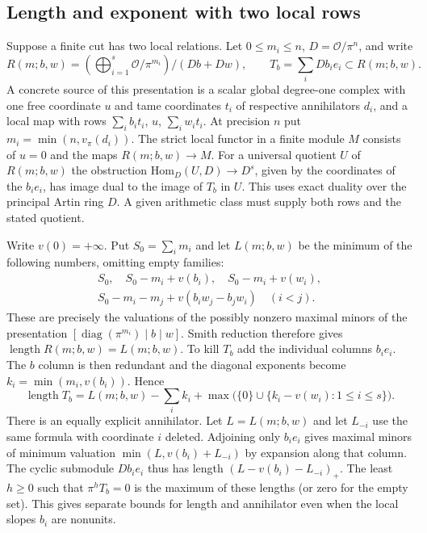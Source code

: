 \documentclass[11pt]{article}
\newcommand{\len}{\operatorname{length}}
\newcommand{\OO}{\mathcal O}
\begin{document}
\subsection{Length and exponent with two local rows}
Suppose a finite cut has two local relations. Let
$0\le m_i\le n$, $D=\OO/\pi^n$, and write
\[
 R(m;b,w)=\left(\bigoplus_{i=1}^s\OO/\pi^{m_i}\right)/(D b+D w),
 \qquad T_b=\sum_i D b_i e_i \subset R(m;b,w).
\]
A concrete source of this presentation is a scalar global
degree-one complex with one free coordinate $u$ and tame coordinates
$t_i$ of respective annihilators $d_i$, and a local map with rows
$\sum_i b_i t_i$, $u$, $\sum_i w_i t_i$. At precision $n$ put
$m_i=\min(n,v_\pi(d_i))$. The strict local functor in a finite module
$M$ consists of $u=0$ and the maps $R(m;b,w)\to M$.
For a universal quotient $U$ of $R(m;b,w)$ the obstruction
$\mathrm{Hom}_D(U,D)\to D^s$, given by the coordinates of the
$b_i e_i$, has image dual to the image of $T_b$ in $U$.
This uses exact duality over the principal Artin ring $D$.
A given arithmetic class must supply both rows and the stated quotient.

Write $v(0)=+\infty$. Put $S_0=\sum_i m_i$ and let $L(m;b,w)$ be
the minimum of the following numbers, omitting empty families:
\[
 \begin{gathered}
 S_0,\quad S_0-m_i+v(b_i),\quad S_0-m_i+v(w_i),\\
 S_0-m_i-m_j+v(b_iw_j-b_jw_i)\quad (i<j).
 \end{gathered}
\]
These are precisely the valuations of the possibly nonzero maximal
minors of the presentation $[\operatorname{diag}(\pi^{m_i})\mid b\mid w]$.
Smith reduction therefore gives $\len R(m;b,w)=L(m;b,w)$. To kill
$T_b$ add the individual columns $b_i e_i$. The $b$ column is then
redundant and the diagonal exponents become $k_i=\min(m_i,v(b_i))$.
Hence
\[
 \len T_b=L(m;b,w)-\sum_i k_i+
       \max\bigl(\{0\}\cup\{k_i-v(w_i):1\le i\le s\}\bigr).
\]
There is an equally explicit annihilator. Let $L=L(m;b,w)$ and let
$L_{-i}$ use the same formula with coordinate $i$ deleted. Adjoining
only $b_i e_i$ gives maximal minors of minimum valuation
$\min(L,v(b_i)+L_{-i})$ by expansion along that column. The cyclic
submodule $D b_i e_i$ thus has length $(L-v(b_i)-L_{-i})_+$. The
least $h\ge0$ such that $\pi^h T_b=0$ is the maximum of these lengths
(or zero for the empty set). This gives separate bounds for length and
annihilator even when the local slopes $b_i$ are nonunits.
\end{document}
